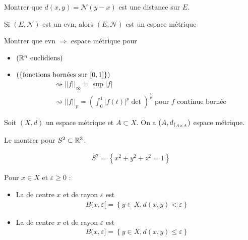 \documentclass[french,a4paper,10pt]{article}
\begin{document}
	\begin{myexercice}
			Montrer que $d(x,y) = \mathcal{N}(y-x)$ est une distance sur $E$.
	\end{myexercice}
	
	\begin{myremark}
		Si $(E, \mathcal{N})$ est un evn, alors $(E, \mathcal{N})$ est un espace métrique
	\end{myremark}
	
	
	\begin{myexercice}
		Montrer que evn $\Longrightarrow$ espace métrique pour
		\begin{itemize}
			\item $(\mathbb{R}^n \text{ euclidiens})$
			\item $(\{\text{fonctions bornées sur }\mathopen{[}0,1\mathclose{]}\})$
			\[\begin{aligned}
				&\rightsquigarrow||f||_\infty = \sup|f|\\
				&\rightsquigarrow||f||_p=\left(\int_0^1|f(t)|^p\det\right)^{\frac1p}\text{ pour }f\text{ continue bornée}
			\end{aligned}\]
		\end{itemize}
	\end{myexercice} 
	
	
	\begin{myexample}
		Soit $(X,d)$ un espace métrique et $A\subset X$. On a $(A, {d}_{\restriction_{A\times A}})$ espace métrique.
	\end{myexample}
	
	\begin{myexercice} 
		Le montrer pour $S^2\subset\mathbb{R}^3$.
	\end{myexercice}
	\begin{myrappel}
		\[\begin{aligned}
			S^2=\left\{x^2+y^2+z^2 = 1\right\}
		\end{aligned}\]
	\end{myrappel}
	
	\begin{definition}
		Pour $x\in X$ et $\varepsilon\ge0$ :
		\begin{itemize}
			\item La  de centre $x$ et de rayon $\varepsilon$ est
			\[\begin{aligned}
				B(x,\varepsilon\mathopen{}[\mathclose{}=\left\{y\in X, d(x,y)<\varepsilon\right\}
			\end{aligned}\]
			\item La  de centre $x$ et de rayon $\varepsilon$ est
			\[\begin{aligned}
				B(x,\varepsilon\mathopen{}]\mathclose{}=\left\{y\in X, d(x,y)\le\varepsilon\right\}
			\end{aligned}\]
		\end{itemize}
	\end{definition}
	
\end{document}
